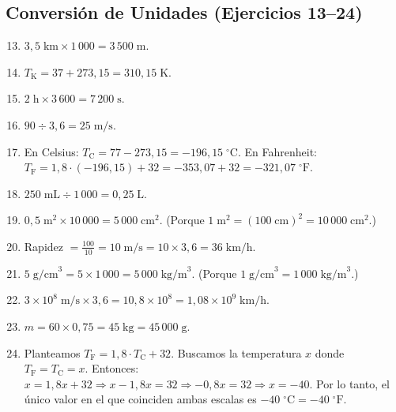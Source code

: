 \documentclass[12pt, letterpaper]{article}
\begin{document}
  \subsection*{Conversión de Unidades (Ejercicios 13--24)}

  \begin{enumerate}[leftmargin=*, label=\textbf{\arabic*.}]
    \setcounter{enumi}{12}
    \item $3{,}5\;\text{km} \times 1\,000 = 3\,500\;\text{m}$.

    \item $T_{\text{K}} = 37 + 273{,}15 = 310{,}15\;\text{K}$.

    \item $2\;\text{h} \times 3\,600 = 7\,200\;\text{s}$.

    \item $90 \div 3{,}6 = 25\;\text{m/s}$.

    \item En Celsius: $T_{\text{C}} = 77 - 273{,}15 = -196{,}15\;^\circ\text{C}$. En Fahrenheit: $T_{\text{F}} = 1{,}8 \cdot (-196{,}15) + 32 = -353{,}07 + 32 = -321{,}07\;^\circ\text{F}$.

    \item $250\;\text{mL} \div 1\,000 = 0{,}25\;\text{L}$.

    \item $0{,}5\;\text{m}^2 \times 10\,000 = 5\,000\;\text{cm}^2$. (Porque $1\;\text{m}^2 = (100\;\text{cm})^2 = 10\,000\;\text{cm}^2$.)

    \item Rapidez $= \frac{100}{10} = 10\;\text{m/s} = 10 \times 3{,}6 = 36\;\text{km/h}$.

    \item $5\;\text{g/cm}^3 = 5 \times 1\,000 = 5\,000\;\text{kg/m}^3$. (Porque $1\;\text{g/cm}^3 = 1\,000\;\text{kg/m}^3$.)

    \item $3 \times 10^8\;\text{m/s} \times 3{,}6 = 10{,}8 \times 10^8 = 1{,}08 \times 10^9\;\text{km/h}$.

    \item $m = 60 \times 0{,}75 = 45\;\text{kg} = 45\,000\;\text{g}$.

    \item Planteamos $T_{\text{F}} = 1{,}8 \cdot T_{\text{C}} + 32$. Buscamos la temperatura $x$ donde $T_{\text{F}} = T_{\text{C}} = x$. Entonces: $x = 1{,}8x + 32 \Rightarrow x - 1{,}8x = 32 \Rightarrow -0{,}8x = 32 \Rightarrow x = -40$. Por lo tanto, el único valor en el que coinciden ambas escalas es $-40\;^\circ\text{C} = -40\;^\circ\text{F}$.
  \end{enumerate}
\end{document}
